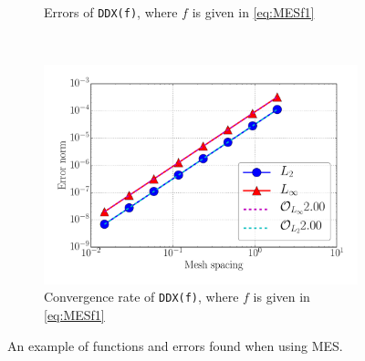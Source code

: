 \begin{figure}[t!]
\begin{subfigure}[t]{0.45\textwidth}
        \caption{Errors of \texttt{DDX(f)}, where $f$ is given in \cref{eq:MESf1}}
        \label{fig:errorsMES}
    \end{subfigure}
    ~
    \begin{subfigure}[t]{0.45\textwidth}
        \centering
        \includegraphics[width=1.0\textwidth]{fig/conv}
        \caption{Convergence rate of \texttt{DDX(f)}, where $f$ is given in \cref{eq:MESf1}}
    \end{subfigure}
    \caption{An example of functions and errors found when using MES.}
\end{figure}

